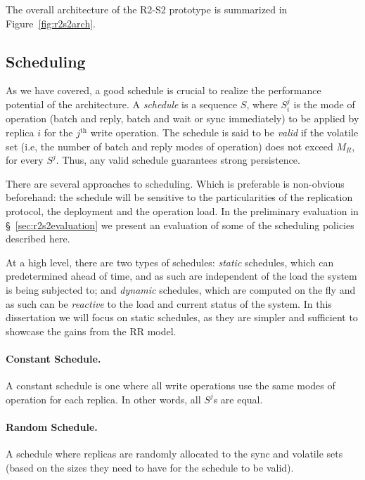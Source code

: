 The overall architecture of the \ac{R2-S2} prototype is
summarized in Figure~\ref{fig:r2s2arch}.

\subsection{Scheduling}\label{ssec:schedule}

As we have covered, a good schedule is crucial to realize the
performance potential of the architecture. A \emph{schedule} is a
sequence $S$, where $S_i^j$ is the mode of operation (batch and
reply, batch and wait or sync immediately) to be applied by replica
$i$ for the $j^\text{th}$ write operation. The
schedule is said to be \emph{valid} if the volatile set (i.e,
the number of batch and reply modes of operation) does not exceed
$M_R$, for every $S^j$. Thus, any valid schedule guarantees
strong persistence.

There are several approaches to scheduling. Which is preferable
is non-obvious beforehand: the schedule will be sensitive to the
particularities of the replication protocol, the deployment and
the operation load. In the preliminary evaluation in
\S~\ref{sec:r2s2evaluation} we present an
evaluation of some of the scheduling policies described
here.


At a high level, there are two types of schedules: \emph{static}
schedules, which can predetermined ahead of time, and as such
are independent of the load the system is being subjected to; and
\emph{dynamic} schedules, which are computed on the fly and as
such can be \emph{reactive} to the load and current status of the
system. In this dissertation we will focus on static schedules,
as they are simpler and sufficient to showcase the gains from the
\ac{RR} model.

\paragraph{Constant Schedule.} A constant schedule is one where
all write operations use the same modes of operation for each
replica. In other words, all $S^j$s are equal.

\paragraph{Random Schedule.} A schedule where replicas are
randomly allocated to the sync and volatile sets (based on the
sizes they need to have for the schedule to be valid).

